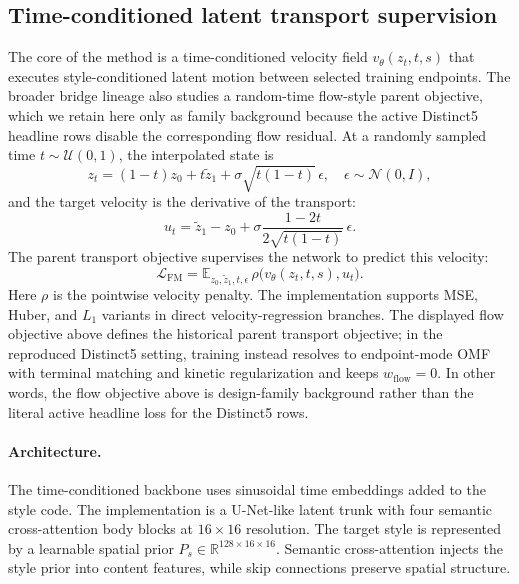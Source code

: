 \documentclass[letterpaper]{article}
\begin{document}
\subsection{Time-conditioned latent transport supervision}
The core of the method is a time-conditioned velocity field $v_\theta(z_t,t,s)$ that executes style-conditioned latent motion between selected training endpoints. The broader bridge lineage also studies a random-time flow-style parent objective, which we retain here only as family background because the active Distinct5 headline rows disable the corresponding flow residual. At a randomly sampled time $t\sim\mathcal{U}(0,1)$, the interpolated state is
\begin{equation}
    z_t = (1-t)z_0 + t\tilde{z}_1 + \sigma\sqrt{t(1-t)}\,\epsilon,
    \quad \epsilon\sim\mathcal{N}(0,I),
\end{equation}
and the target velocity is the derivative of the transport:
\begin{equation}
    u_t = \tilde{z}_1 - z_0 + \sigma\frac{1-2t}{2\sqrt{t(1-t)}}\,\epsilon .
\end{equation}
The parent transport objective supervises the network to predict this velocity:
\begin{equation}
    \mathcal{L}_{\mathrm{FM}} = \mathbb{E}_{z_0,\tilde{z}_1,t,\epsilon}\,
    \rho\!\bigl(v_\theta(z_t,t,s), u_t\bigr) .
\end{equation}
Here $\rho$ is the pointwise velocity penalty. The implementation supports MSE, Huber, and $L_1$ variants in direct velocity-regression branches. The displayed flow objective above defines the historical parent transport objective; in the reproduced Distinct5 setting, training instead resolves to endpoint-mode OMF with terminal matching and kinetic regularization and keeps $w_{\mathrm{flow}}=0$. In other words, the flow objective above is design-family background rather than the literal active headline loss for the Distinct5 rows.

\paragraph{Architecture.}
The time-conditioned backbone uses sinusoidal time embeddings added to the style code. The implementation is a U-Net-like latent trunk with four semantic cross-attention body blocks at $16\times16$ resolution. The target style is represented by a learnable spatial prior $P_s\in\mathbb{R}^{128\times16\times16}$. Semantic cross-attention injects the style prior into content features, while skip connections preserve spatial structure.
\end{document}
